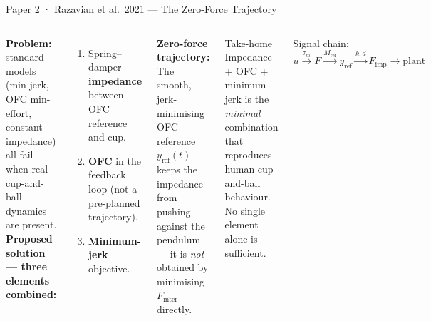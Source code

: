 \documentclass[aspectratio=169,10pt]{beamer}
\begin{document}
\begin{frame}{Paper 2 · Razavian et al.\ 2021 --- The Zero-Force Trajectory}
\begin{columns}[T]
  \textbf{Problem:} standard models (min-jerk, OFC min-effort, constant
  impedance) all fail when real cup-and-ball dynamics are present.\\[6pt]
  \textbf{Proposed solution --- three elements combined:}
  \begin{enumerate}\setlength\itemsep{3pt}
    \item Spring--damper \textbf{impedance} between OFC reference and cup.
    \item \textbf{OFC} in the feedback loop (not a pre-planned trajectory).
    \item \textbf{Minimum-jerk} objective.
  \end{enumerate}
  \vspace{4pt}
  \textbf{Zero-force trajectory:}  The smooth, jerk-minimising OFC reference
  $y_\text{ref}(t)$ keeps the impedance from pushing against the pendulum
  --- it is \emph{not} obtained by minimising $F_\text{inter}$ directly.

  \begin{alertblock}{Take-home}
    Impedance + OFC + minimum jerk is the \emph{minimal} combination
    that reproduces human cup-and-ball behaviour.\\[4pt]
    No single element alone is sufficient.
  \end{alertblock}
  \vspace{6pt}
  Signal chain:\vspace{2pt}
  \[
    u \xrightarrow{\tau_m} F \xrightarrow{M_\text{ref}} y_\text{ref}
      \xrightarrow{k,d} F_\text{imp} \to \text{plant}
  \]
\end{columns}
\end{frame}
\end{document}
